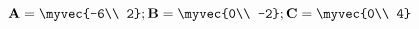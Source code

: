 \documentclass[article,12pt]{IEEEtran}
\begin{document}
\providecommand{\pr}[1]{\ensuremath{\Pr\left(#1\right)}}
\providecommand{\qfunc}[1]{\ensuremath{Q\left(#1\right)}}
	\newcommand*{\permcomb}[4][0mu]{{{}^{#3}\mkern#1#2_{#4}}}
\newcommand*{\perm}[1][-3mu]{\permcomb[#1]{P}}
\newcommand*{\comb}[1][-1mu]{\permcomb[#1]{C}}
\providecommand{\qfunc}[1]{\ensuremath{Q\left(#1\right)}}
\providecommand{\gauss}[2]{\mathcal{N}\ensuremath{\left(#1,#2\right)}}
\providecommand{\diff}[2]{\ensuremath{\frac{d{#1}}{d{#2}}}}
\providecommand{\myceil}[1]{\left \lceil #1 \right \rceil }
\newcommand\figref{Fig.~\ref}
\newcommand\tabref{Table~\ref}
\newcommand{\sinc}{\,\text{sinc}\,}
\newcommand{\rect}{\,\text{rect}\,}

\let\vec\mathbf

$\vec{A} =\myvec{-6\\ 2}; 
\vec{B} =\myvec{0\\ -2}; 
\vec{C} =\myvec{0\\ 4}$ \\

\else

    \def\gnumericTableEnd{}



\fi

\end{document}
